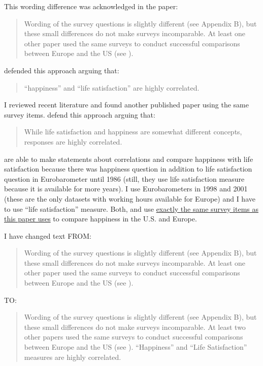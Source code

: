  This wording difference was acknowledged in the paper:

\begin{quote}
 Wording of the
survey questions is slightly
different (see  Appendix B), but these small
differences do not make surveys
incomparable. At least one other paper used the same surveys
to conduct successful comparisons
between Europe and the US (see \citet{alesina03}). 
\end{quote}

\noindent\citet[2013/2/11]{alesina03} defended this approach arguing that:
\begin{quote}
 ``happiness'' and ``life satisfaction'' are
highly correlated. 
\end{quote}


\noindent I reviewed recent literature and found another published paper  using the same survey items. \citet[211/2/20]{stevenson09w} defend this approach arguing that:  
\begin{quote}
While life satisfaction and happiness are somewhat different
concepts, responses are highly correlated.
\end{quote}

\noindent \citet{alesina03} \citet{stevenson09w} are able to make statements about correlations and compare
happiness with life satisfaction because there was happiness question in addition to life
satisfaction question in Eurobarometer until 1986
(still, they use life satisfaction measure because it is available for more years).
I use Eurobarometers in 1998 and 2001 (these are the only datasets with working hours available
for Europe) and I have to use ``life satisfaction'' measure. Both, \citet{alesina03} and
\citet{stevenson09w} use \underline{exactly the same survey items as this paper uses} to compare
happiness in the U.S. and Europe.

 I have changed text FROM:

\begin{quote}
 Wording of the
survey questions is slightly
different (see  Appendix B), but these small
differences do not make surveys
incomparable. At least one other paper used the same surveys
to conduct successful comparisons
between Europe and the US (see \citet{alesina03}). 
\end{quote}

\noindent TO:

\begin{quote}
Wording of the
survey questions is slightly
different (see  Appendix B), but these small
differences do not make surveys
incomparable. At least two other papers used the same surveys
to conduct successful comparisons
between Europe and the US (see \citet{alesina03, stevenson09w}). ``Happiness'' and ``Life
Satisfaction'' measures are highly correlated. 
\end{quote}

